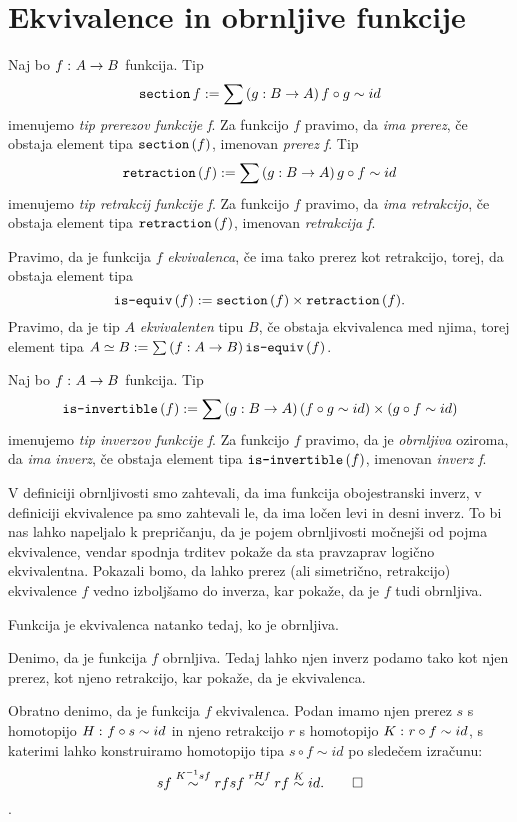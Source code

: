 \section{Ekvivalence in obrnljive funkcije}
\begin{definicija}
  Naj bo \(f \,\colon A \to B\) funkcija. Tip
  \[\textnormal{\texttt{section}}\, f := \sum \left( g : B \to A \right) f \circ g \sim id\]
  imenujemo \emph{tip prerezov funkcije f}. Za funkcijo \(f\) pravimo, da
  \emph{ima prerez}, če obstaja element tipa \(\textnormal{\texttt{section}}\,(f)\), imenovan \emph{prerez f}.
  Tip \[\textnormal{\texttt{retraction}}\,(f) := \sum \left( g : B \to A \right) g \circ f \sim id\] imenujemo
  \emph{tip retrakcij funkcije f}. Za funkcijo \(f\) pravimo, da \emph{ima retrakcijo}, če
  obstaja element tipa \(\textnormal{\texttt{retraction}}\,(f)\), imenovan \emph{retrakcija f}.
\end{definicija}
\begin{definicija}
  Pravimo, da je funkcija \(f\) \emph{ekvivalenca}, če ima tako prerez kot retrakcijo,
  torej, da obstaja element tipa \[\textnormal{\texttt{is-equiv}}\,(f) := \textnormal{\texttt{section}}\,(f) \times \textnormal{\texttt{retraction}}\,(f).\]
  Pravimo, da je tip \(A\) \emph{ekvivalenten} tipu \(B\), če obstaja ekvivalenca med
  njima, torej element tipa \(A \simeq B := \sum \left( f : A \to B \right) \textnormal{\texttt{is-equiv}}\,(f)\).
\end{definicija}

\begin{definicija}
  Naj bo \(f \,\colon A \to B\) funkcija. Tip
  \[\textnormal{\texttt{is-invertible}}\,(f) := \sum \left( g : B \to A \right) (f \circ g \sim id) \times (g \circ f \sim id)\]
  imenujemo \emph{tip inverzov funkcije f}. Za funkcijo \(f\) pravimo, da je
  \emph{obrnljiva} oziroma, da \emph{ima inverz}, če obstaja element tipa
  \(\textnormal{\texttt{is-invertible}}\,(f)\), imenovan \emph{inverz f}.
\end{definicija}

V definiciji obrnljivosti smo zahtevali, da ima funkcija obojestranski inverz, v
definiciji ekvivalence pa smo zahtevali le, da ima ločen levi in desni inverz.
To bi nas lahko
napeljalo k prepričanju, da je pojem obrnljivosti močnejši od pojma ekvivalence, vendar
spodnja trditev pokaže da sta pravzaprav logično ekvivalentna. Pokazali bomo, da lahko
prerez (ali simetrično, retrakcijo) ekvivalence \(f\) vedno izboljšamo do inverza,
kar pokaže, da je \(f\) tudi obrnljiva.

\begin{trditev}
  Funkcija je ekvivalenca natanko tedaj, ko je obrnljiva.
\end{trditev}

\begin{dokaz}
  Denimo, da je funkcija \(f\) obrnljiva. Tedaj lahko njen inverz podamo tako kot njen
  prerez, kot njeno retrakcijo, kar pokaže, da je ekvivalenca.

  Obratno denimo, da je funkcija \(f\) ekvivalenca. Podan imamo njen prerez \(s\) s
  homotopijo \(H \,\colon f \circ s \sim id\) in njeno retrakcijo \(r\) s homotopijo
  \(K \,\colon r \circ f \sim id\), s katerimi lahko konstruiramo homotopijo tipa
  \(s \circ f \sim id\) po sledečem izračunu:
  \[s f \overset{K^{-1}sf}{\sim} r f s f \overset{rHf}{\sim} r f \overset{K}{\sim} id. \qedhere\].
\end{dokaz}


